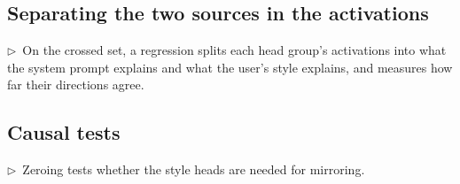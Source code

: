 \documentclass[11pt]{article}
\newcommand{\flow}[1]{\par\noindent\textcolor{blue!60!black}{\small$\triangleright$\ #1}\par\medskip}
\begin{document}
\subsection{Separating the two sources in the activations}
\flow{On the crossed set, a regression splits each head group's activations into what the system prompt explains and what the user's style explains, and measures how far their directions agree.}

\subsection{Causal tests}
\flow{Zeroing tests whether the style heads are needed for mirroring.}
\end{document}
